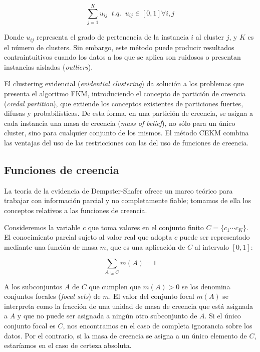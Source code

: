 \begin{equation}
\sum_{j=1}^{K} u_{ij} \;\; t.q. \;\; u_{ij} \in [0,1] \forall i,j
\label{eqn2}
\end{equation}

Donde $u_{ij}$ representa el grado de pertenencia de la instancia $i$ al cluster $j$, y $K$ es el número de clusters. Sin embargo, este método puede producir resultados contraintuitivos cuando los datos a los que se aplica son ruidosos o presentan instancias aisladas (\textit{outliers}).

El clustering evidencial (\textit{evidential clustering}) da solución a los problemas que presenta el algoritmo \acs{FKM}, introduciendo el concepto de partición de creencia (\textit{credal partition}), que extiende los conceptos existentes de particiones fuertes, difusas y probabilísticas. De esta forma, en una partición de creencia, se asigna a cada instancia una masa de creencia (\textit{mass of belief}), no sólo para un único cluster, sino para cualquier conjunto de los mismos. El método \acs{CEKM} combina las ventajas del uso de las restricciones con las del uso de funciones de creencia.

\subsection{Funciones de creencia}

La teoría de la evidencia de Dempster-Shafer ofrece un marco teórico para trabajar con información parcial y no completamente fiable; tomamos de ella los conceptos relativos a las funciones de creencia.

Consideremos la variable $c$ que toma valores en el conjunto finito $C = \{c_1 \cdots c_K \}$. El conocimiento parcial sujeto al valor real que adopta $c$ puede ser representado mediante una función de masa $m$, que es una aplicación de $C$ al intervalo $[0,1]$:

\begin{equation}
\sum_{A \subseteq C} m(A) = 1
\label{eqn3}
\end{equation}

A los subconjuntos $A$ de $C$ que cumplen que $m(A) > 0$ se los denomina conjuntos focales (\textit{focal sets}) de $m$. El valor del conjunto focal $m(A)$ se interpreta como la fracción de una unidad de masa de creencia que está asignada a $A$ y que no puede ser asignada a ningún otro subconjunto de $A$. Si el único conjunto focal es $C$, nos encontramos en el caso de completa ignorancia sobre los datos. Por el contrario, si la masa de creencia se asigna a un único elemento de $C$, estaríamos en el caso de certeza absoluta.

